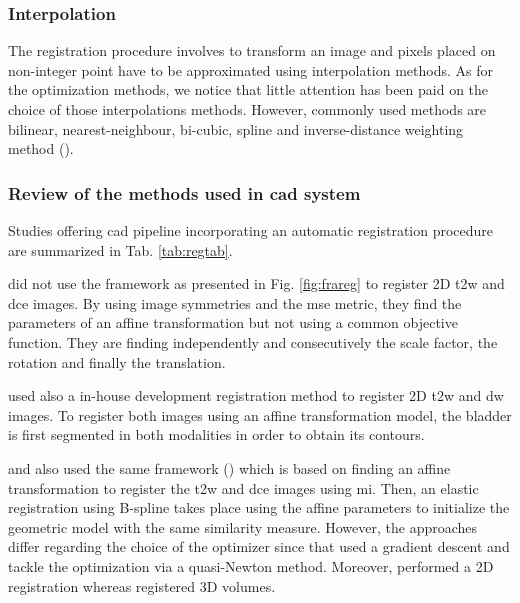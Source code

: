 \subsubsection{Interpolation}\label{subsubsec:int}

The registration procedure involves to transform an image and pixels placed on non-integer point have to be approximated using interpolation methods. As for the optimization methods, we notice that little attention has been paid on the choice of those interpolations methods. However, commonly used methods are bilinear, nearest-neighbour, bi-cubic, spline and inverse-distance weighting method (\cite{Mitra2012}).

\subsubsection{Review of the methods used in \ac{cad} system}\label{subsubsec:regrev}

Studies offering \ac{cad} pipeline incorporating an automatic registration procedure are summarized in Tab. \ref{tab:regtab}. 

\cite{Ampeliotis2007,Ampeliotis2008} did not use the framework as presented in Fig. \ref{fig:frareg} to register 2D \ac{t2w} and \ac{dce} images. By using image symmetries and the \ac{mse} metric, they find the parameters of an affine transformation but not using a common objective function. They are finding independently and consecutively the scale factor, the rotation and finally the translation.

\cite{Giannini2013} used also a in-house development registration method to register 2D \ac{t2w} and \ac{dw} images. To register both images using an affine transformation model, the bladder is first segmented in both modalities in order to obtain its contours.

\cite{Giannini2013} and also \cite{Vos2010} used the same framework (\cite{Rueckert1999}) which is based on finding an affine transformation to register the \ac{t2w} and \ac{dce} images using \ac{mi}. Then, an elastic registration using B-spline takes place using the affine parameters to initialize the geometric model with the  same similarity measure. However, the approaches differ regarding the choice of the optimizer since that \cite{Giannini2013} used a gradient descent and \cite{Vos2010} tackle the optimization via a quasi-Newton method. Moreover, \cite{Giannini2013} performed a 2D registration whereas \cite{Vos2010} registered 3D volumes.

